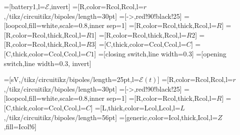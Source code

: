 \usepackage[siunitx]{circuitikz} %
\usepackage[outline]{contour} %
\usetikzlibrary{arrows,arrows.meta}
\usetikzlibrary{decorations.markings}
\tikzset{>=latex} %
\usepackage{xcolor}
\newcommand\EMF{\mathcal{E}} %
\contourlength{1.5pt}
=[battery1,l=$\EMF$,invert]
=[R,color=Rcol,Rcol,l=$r$,/tikz/circuitikz/bipoles/length=30pt]
=[->,red!90!black!25]
=[loopcol,fill=white,scale=0.8,inner sep=1]
=[R,color=Rcol,thick,Rcol,l=$R$]
=[R,color=Rcol,thick,Rcol,l=$R1$]
=[R,color=Rcol,thick,Rcol,l=$R2$]
=[R,color=Rcol,thick,Rcol,l=$R3$]
=[C,thick,color=Ccol,Ccol,l=$C$]
=[C,thick,color=Ccol,Ccol,l=$C1$]
=[closing switch,line width=0.3] %
=[opening switch,line width=0.3, invert] %




\usepackage[siunitx]{circuitikz} %
\usepackage[outline]{contour} %
\usetikzlibrary{arrows,arrows.meta}
\usetikzlibrary{decorations.markings}
\tikzset{>=latex} %
\usepackage{xcolor}
\contourlength{1.5pt}
=[sV,/tikz/circuitikz/bipoles/length=25pt,l=$\EMF(t)$]
=[R,color=Rcol,Rcol,l=$r$,/tikz/circuitikz/bipoles/length=30pt]
=[->,red!90!black!25]
=[loopcol,fill=white,scale=0.8,inner sep=1]
=[R,color=Rcol,thick,Rcol,l=$R$]
=[C,thick,color=Ccol,Ccol,l=$C$]
=[L,thick,color=Lcol,Lcol,l=$L$,/tikz/circuitikz/bipoles/length=56pt] %
=[generic,color=Icol,thick,Icol,l=$Z$,fill=Icol!6]


